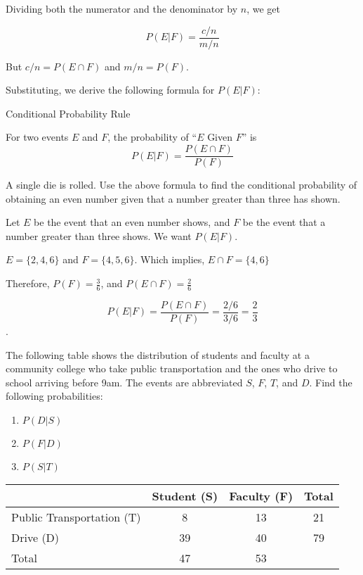 Dividing both the numerator and the denominator by \(n\), we get

\[
    P(E | F) = \frac{c/n}{m/n}
\]

But \(c/n = P(E \cap F)\) and \(m/n = P(F)\).

Substituting, we derive the following formula for \(P(E | F)\):

\begin{summarybox}{Conditional Probability Rule}\label{summary_conditional_proability_rule}

    For two events $E$ and $F$, the probability of ``$E$ Given $F$'' is
    \[
        P(E | F) = \frac{P(E \cap F)}{P(F)}
    \]
\end{summarybox}

\begin{example}
    A single die is rolled. Use the above formula to find the conditional probability of obtaining an even number given that a number greater than three has shown.
\end{example}

\begin{solution}
    Let \( E \) be the event that an even number shows, and \( F \) be the event that a number greater than three shows. We want \( P(E | F) \).

    \( E = \{2, 4, 6\} \) and \( F = \{4, 5, 6\} \). Which implies, \( E \cap F = \{4, 6\} \)

    Therefore, \( P(F) = \frac{3}{6} \), and \( P(E \cap F) = \frac{2}{6} \)

    \[ P(E | F) = \frac{P(E \cap F)}{P(F)} = \frac{2/6}{3/6} = \frac{2}{3} \].
\end{solution}

\begin{example}
    The following table shows the distribution of students and faculty at a community college who take public transportation and the ones who drive to school arriving before 9am. The events are abbreviated \(S\), \(F\), \(T\), and \(D\). Find the following probabilities:
    \begin{enumerate}
        \item \(P(D | S)\)
        \item \(P(F | D)\)
        \item \(P(S | T)\)
    \end{enumerate}
\end{example}

\begin{table}[ht]
    \centering
    \begin{tabular}{|l|c|c|c|}
        \hline
                                  & Student (S) & Faculty (F) & Total \\
        \hline
        Public Transportation (T) & 8           & 13          & 21    \\
        Drive (D)                 & 39          & 40          & 79    \\
        Total                     & 47          & 53          &       \\
        \hline
    \end{tabular}
\end{table}

